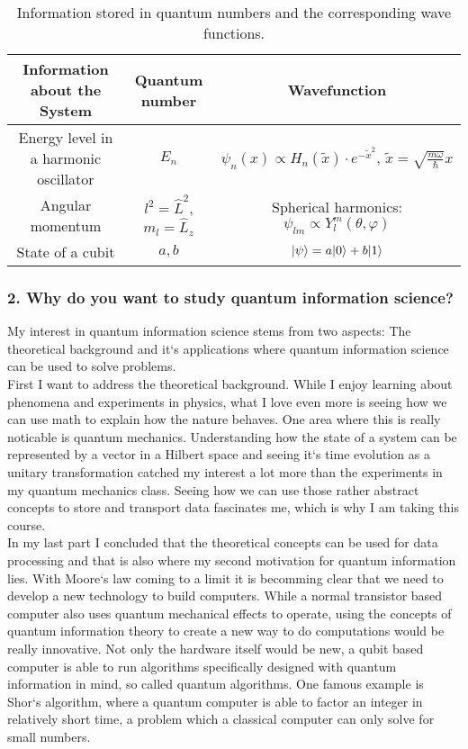 \documentclass[english]{article}
\DeclarePairedDelimiter\ket{\lvert}{\rangle}
\begin{document}
\begin{table}[H]
  \centering
  \caption{Information stored in quantum numbers and the corresponding wave functions.}
  \label{tab:wave_functions}
  \begin{tabular}{ccc}
  \toprule
  Information about the System &
  Quantum number &
  Wavefunction \\
  \midrule
  Energy level in a harmonic oscillator & 
  $E_n$ & $\psi_n(x) \propto H_n(\tilde{x}) \cdot e^{-\tilde{x}^2}, \, \tilde{x} =
  \sqrt{\frac{m\omega}{\hbar}} x $ \\
  Angular momentum &
  $l^2 = \hat L^2$, $m_l = \hat L_z$ &
  Spherical harmonics: $\psi_{lm} \propto Y_l^m(\theta, \varphi)$ \\
  State of a cubit &
  $a, b$ &
  $\ket{\psi} = a \ket{0} + b \ket{1}$ \\
  \end{tabular}
\end{table}

\newpage
\subsubsection*{2. Why do you want to study quantum information science?}
My interest in quantum information science stems from two aspects: The theoretical
background and it`s applications where quantum information science can be used to solve
problems.
\\
First I want to address the theoretical background. While I enjoy learning about
phenomena and experiments in physics, what I love even
more is seeing how we can use math to explain how the nature behaves. One area where this
is really noticable is quantum mechanics. Understanding how the state of a system can 
be represented by a vector in a Hilbert space and seeing it`s time evolution as a unitary
transformation catched my interest a lot more than the experiments in my quantum mechanics
class. Seeing how we can use those rather abstract concepts to store and transport data
fascinates me, which is why I am taking this course.
\\
In my last part I concluded that the  theoretical concepts can be used for data processing
and that is also where my second motivation for quantum information lies. With Moore`s law
coming to a limit it is becomming clear that we need to develop a new technology to build
computers. While a normal transistor based computer also uses quantum mechanical effects
to operate, using the concepts of quantum information theory to create a new way to
do computations would be really innovative. Not only the hardware itself would be new,
a qubit based computer is able to run algorithms specifically designed with quantum
information in mind, so called quantum algorithms. One famous example is Shor`s algorithm,
where a quantum computer is able to factor an integer in relatively short time, a problem
which a classical computer can only solve for small numbers.
\end{document}
